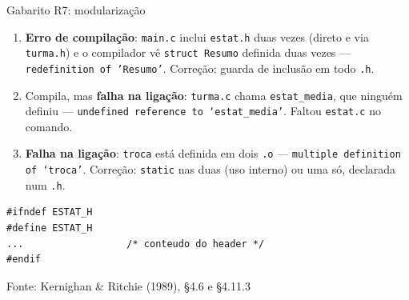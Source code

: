 \documentclass[aspectratio=169]{beamer}
\newcommand{\fonte}[1]{\vfill\hfill{\scriptsize\textcolor{UFSGray}{Fonte: #1}}}
\begin{document}
\begin{frame}[fragile]{Gabarito R7: modularização}
  \small
  \begin{enumerate}
    \item[(a)] \textbf{Erro de compilação}: \texttt{main.c} inclui
      \texttt{estat.h} duas vezes (direto e via \texttt{turma.h}) e o
      compilador vê \texttt{struct Resumo} definida duas vezes ---
      \texttt{redefinition of 'Resumo'}. Correção: guarda de inclusão em
      todo \texttt{.h}.
    \item[(b)] Compila, mas \textbf{falha na ligação}: \texttt{turma.c} chama
      \texttt{estat\_media}, que ninguém definiu --- \texttt{undefined
      reference to `estat\_media'}. Faltou \texttt{estat.c} no comando.
    \item[(c)] \textbf{Falha na ligação}: \texttt{troca} está definida em
      dois \texttt{.o} --- \texttt{multiple definition of `troca'}. Correção:
      \texttt{static} nas duas (uso interno) ou uma só, declarada num
      \texttt{.h}.
  \end{enumerate}
\begin{lstlisting}[style=shellStyle]
#ifndef ESTAT_H
#define ESTAT_H
...                  /* conteudo do header */
#endif
\end{lstlisting}
  \fonte{Kernighan \& Ritchie (1989), §4.6 e §4.11.3~\cite{kernighan1989c}}
\end{frame}
\end{document}
